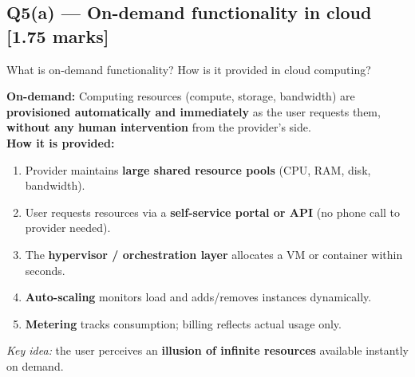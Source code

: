 \documentclass[12pt, a4paper]{article}
\newenvironment{qbox}{\begin{mdframed}[style=qframe]}{\end{mdframed}}
\newenvironment{solbox}{\begin{mdframed}[style=solframe]}{\end{mdframed}}
\newcommand{\qmarks}[1]{\hfill\textbf{\color{orange!70!black}[#1 marks]}}
\begin{document}
\subsection{Q5(a) --- On-demand functionality in cloud
  \texorpdfstring{\qmarks{1.75}}{}}
\begin{qbox}What is on-demand functionality? How is it provided in cloud computing?\end{qbox}
\begin{solbox}
\textbf{On-demand:} Computing resources (compute, storage, bandwidth) are
\textbf{provisioned automatically and immediately} as the user requests them,
\textbf{without any human intervention} from the provider's side.\\[4pt]

\textbf{How it is provided:}
\begin{enumerate}[leftmargin=1.6cm, itemsep=2pt]
  \item Provider maintains \textbf{large shared resource pools} (CPU, RAM, disk, bandwidth).
  \item User requests resources via a \textbf{self-service portal or API} (no phone call to
    provider needed).
  \item The \textbf{hypervisor / orchestration layer} allocates a VM or container within
    seconds.
  \item \textbf{Auto-scaling} monitors load and adds/removes instances dynamically.
  \item \textbf{Metering} tracks consumption; billing reflects actual usage only.
\end{enumerate}
\textit{Key idea:} the user perceives an \textbf{illusion of infinite resources} available
instantly on demand.
\end{solbox}

\end{document}
